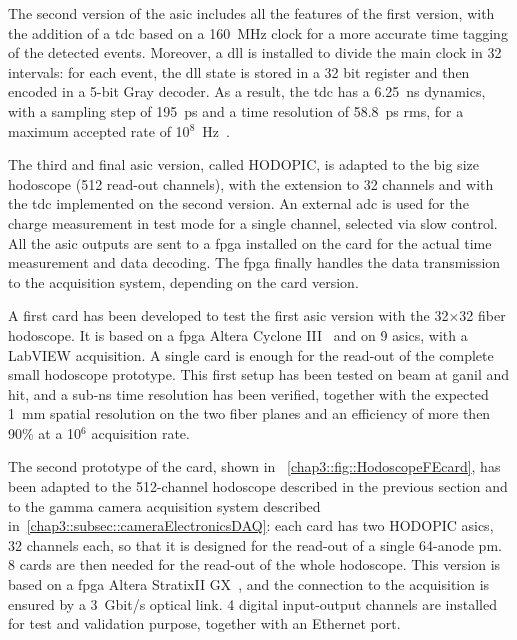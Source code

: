The second version of the \gls{asic} includes all the features of the first version, with the addition of a \gls{tdc} based on a 160~MHz clock for a more accurate time tagging of the detected events. Moreover, a \gls{dll} is installed to divide the main clock in 32 intervals: for each event, the \gls{dll} state is stored in a 32 bit register and then encoded in a 5-bit Gray decoder. As a result, the \gls{tdc} has a 6.25~ns dynamics, with a sampling step of 195~ps and a time resolution of 58.8~ps \gls{rms}, for a maximum accepted rate of 10$^{8}$~Hz~\parencite{Deng2012b}.

The third and final \gls{asic} version, called HODOPIC, is adapted to the big size hodoscope (512 read-out channels), with the extension to 32 channels and with the \gls{tdc} implemented on the second version. An external \gls{adc} is used for the charge measurement in test mode for a single channel, selected via slow control. All the \gls{asic} outputs are sent to a \gls{fpga} installed on the card for the actual time measurement and data decoding. The \gls{fpga} finally handles the data transmission to the acquisition system, depending on the card version.

A first card has been developed to test the first \gls{asic} version with the 32$\times$32 fiber hodoscope. It is based on a \gls{fpga} Altera Cyclone III~\parencite{Altera2012} and on 9 \glspl{asic}, with a LabVIEW acquisition. A single card is enough for the read-out of the complete small hodoscope prototype. This first setup has been tested on beam at \gls{ganil} and \gls{hit}, and a sub-ns time resolution has been verified, together with the expected 1~mm spatial resolution on the two fiber planes and an efficiency of more then 90\% at a 10$^{6}$ acquisition rate.

The second prototype of the card, shown in \figurename~\ref{chap3::fig::HodoscopeFEcard}, has been adapted to the 512-channel hodoscope described in the previous section and to the gamma camera acquisition system described in~\ref{chap3::subsec::cameraElectronicsDAQ}: each card has two HODOPIC \glspl{asic}, 32 channels each, so that it is designed for the read-out of a single 64-anode \gls{pm}. 8 cards are then needed for the read-out of the whole hodoscope. This version is based on a \gls{fpga} Altera StratixII GX~\parencite{Altera2009}, and the connection to the acquisition is ensured by a 3~Gbit/s optical link. 4 digital input-output channels are installed for test and validation purpose, together with an Ethernet port.

